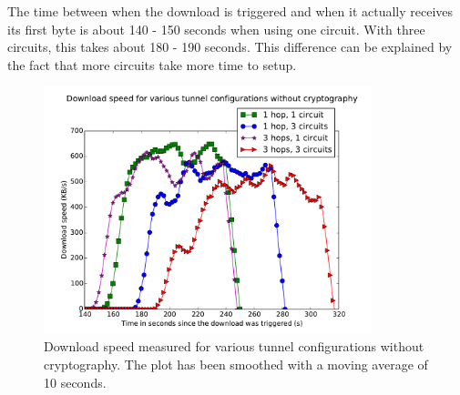 The time between when the download is triggered and when it actually receives its first byte is about 140 - 150 seconds when using one circuit. With three circuits, this takes about 180 - 190 seconds. This difference can be explained by the fact that more circuits take more time to setup.

\begin{figure}[t]
	\centering
	\includegraphics[width=0.85\textwidth]{graphics/downloadspeed.pdf}
	\caption{Download speed measured for various tunnel configurations without cryptography. The plot has been smoothed with a moving average of 10 seconds.}
	\label{fig:download_measurements}
\end{figure}
